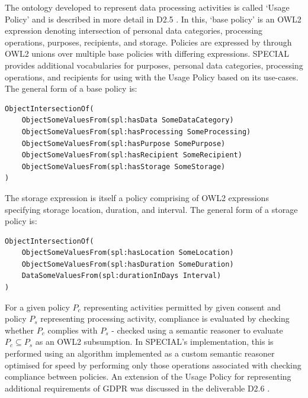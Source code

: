 The ontology developed to represent data processing activities is called `Usage Policy' \cite{bonatti_special_2018-2} and is described in more detail in D2.5 \cite{bonatti_d2.5_2018}. In this, `base policy' is an OWL2 expression denoting intersection of personal data categories, processing operations, purposes, recipients, and storage. Policies are expressed by through OWL2 unions over multiple base policies with differing expressions. SPECIAL provides additional vocabularies for purposes, personal data categories, processing operations, and recipients for using with the Usage Policy based on its use-cases. The general form of a base policy is:
\begin{listing}[htbp]
\begin{verbatim}
ObjectIntersectionOf(
    ObjectSomeValuesFrom(spl:hasData SomeDataCategory)
    ObjectSomeValuesFrom(spl:hasProcessing SomeProcessing)
    ObjectSomeValuesFrom(spl:hasPurpose SomePurpose)
    ObjectSomeValuesFrom(spl:hasRecipient SomeRecipient)
    ObjectSomeValuesFrom(spl:hasStorage SomeStorage)
)
\end{verbatim}
\end{listing}
The storage expression is itself a policy comprising of OWL2 expressions specifying storage location, duration, and interval. The general form of a storage policy is:
\begin{listing}[htbp]
\begin{verbatim}
ObjectIntersectionOf(
    ObjectSomeValuesFrom(spl:hasLocation SomeLocation)
    ObjectSomeValuesFrom(spl:hasDuration SomeDuration)
    DataSomeValuesFrom(spl:durationInDays Interval)
)
\end{verbatim}
\end{listing}

For a given policy $P_c$ representing activities permitted by given consent and policy $P_s$ representing processing activity, compliance is evaluated by checking whether $P_c$ complies with $P_s$ - checked using a semantic reasoner to evaluate $P_c \subseteq P_s$ as an OWL2 subsumption. In SPECIAL's implementation, this is performed using an algorithm \cite{bonatti_fast_2018,bonatti_richer_2019} implemented as a custom semantic reasoner optimised for speed by performing only those operations associated with checking compliance between policies.
An extension of the Usage Policy for representing additional requirements of GDPR was discussed in the deliverable D2.6 \cite{bonatti_d2.6_2018}.

